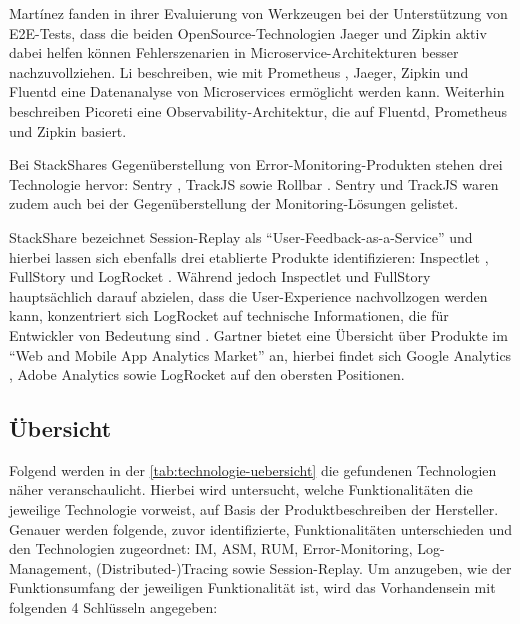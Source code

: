 Mart{\'i}nez \etal \cite{ComparisonOfE2ETestingToolsForMicroservices} fanden in ihrer Evaluierung von Werkzeugen bei der Unterstützung von E2E-Tests, dass die beiden OpenSource-Technologien Jaeger \cite{Jaeger} und Zipkin \cite{Zipkin} aktiv dabei helfen können Fehlerszenarien in Microservice-Architekturen besser nachzuvollziehen. Li \etal \cite{ServiceMeshChallengesStateOfTheArt} beschreiben, wie mit Prometheus \cite{Prometheus}, Jaeger, Zipkin und Fluentd \cite{Fluentd} eine Datenanalyse von Microservices ermöglicht werden kann. Weiterhin beschreiben Picoreti \etal \cite{MultilevelObservabilityInCloudOrchestration} eine Observability-Architektur, die auf Fluentd, Prometheus und Zipkin basiert.

Bei StackShares Gegenüberstellung von Error-Monitoring-Produkten \cite{StackShareExceptionMonitoring} stehen drei Technologie hervor: Sentry \cite{Sentry}, TrackJS \cite{TrackJS} sowie Rollbar \cite{Rollbar}. Sentry und TrackJS waren zudem auch bei der Gegenüberstellung der Monitoring-Lösungen \cite{StackShareMonitoring} gelistet.

StackShare bezeichnet Session-Replay als \enquote{User-Feedback-as-a-Service} und hierbei \cite{StackShareUserFeedbackAsAService} lassen sich ebenfalls drei etablierte Produkte identifizieren: Inspectlet \cite{Inspectlet}, FullStory \cite{FullStory} und LogRocket \cite{LogRocket}. Während jedoch Inspectlet und FullStory hauptsächlich darauf abzielen, dass die User-Experience nachvollzogen werden kann, konzentriert sich LogRocket auf technische Informationen, die für Entwickler von Bedeutung sind \cite{Webalyt}. Gartner bietet eine Übersicht \cite{GartnerWebAndMobileAppAnalytics} über Produkte im \enquote{Web and Mobile App Analytics Market} an, hierbei findet sich Google Analytics \cite{GoogleAnalytics}, Adobe Analytics \cite{AdobeAnalytics} sowie LogRocket auf den obersten Positionen.

\subsection{Übersicht}

Folgend werden in der \autoref{tab:technologie-uebersicht} die gefundenen Technologien näher veranschaulicht. Hierbei wird untersucht, welche Funktionalitäten die jeweilige Technologie vorweist, auf Basis der Produktbeschreiben der Hersteller. Genauer werden folgende, zuvor identifizierte, Funktionalitäten unterschieden und den Technologien zugeordnet: IM, ASM, RUM, Error-Monitoring, Log-Management, (Distributed-)Tracing sowie Session-Replay. Um anzugeben, wie der Funktionsumfang der jeweiligen Funktionalität ist, wird das Vorhandensein mit folgenden 4 Schlüsseln angegeben:

